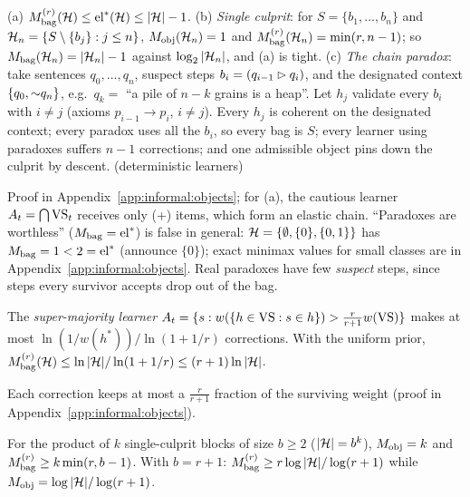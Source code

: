 \begin{theorem}\label{thm:informal:paradoxes}
(a) $M^{(r)}_{\mathrm{bag}}(\mathcal{H})\le\mathrm{el}^*(\mathcal{H})\le|\mathcal{H}|-1$. (b) \emph{Single culprit}: for $S=\{b_1,\dots,b_n\}$ and $\mathcal{H}_n=\{S\setminus\{b_j\}:j\le n\}$, $M_{\mathrm{obj}}(\mathcal{H}_n)=1$ and $M^{(r)}_{\mathrm{bag}}(\mathcal{H}_n)=\min(r,n-1)$; so $M_{\mathrm{bag}}(\mathcal{H}_n)=|\mathcal{H}_n|-1$ against $\log_2|\mathcal{H}_n|$, and (a) is tight. (c) \emph{The chain paradox}: take sentences $q_0,\dots,q_n$, suspect steps $b_i=(q_{i-1}\rhd q_i)$, and the designated context $\{q_0,{\sim} q_n\}$, e.g.\ $q_k=$ ``a pile of $n-k$ grains is a heap''. Let $h_j$ validate every $b_i$ with $i\ne j$ (axioms $p_{i-1}\to p_i$, $i\ne j$). Every $h_j$ is coherent on the designated context; every paradox uses all the $b_i$, so every bag is $S$; every learner using paradoxes suffers $n-1$ corrections; and one admissible object pins down the culprit by descent. \hfill{} (deterministic learners)
\end{theorem}

Proof in Appendix~\ref{app:informal:objects}; for (a), the cautious learner $A_t=\bigcap\mathrm{VS}_t$ receives only (+) items, which form an elastic chain. ``Paradoxes are worthless'' ($M_{\mathrm{bag}}=\mathrm{el}^*$) is false in general: $\mathcal{H}=\{\emptyset,\{0\},\{0,1\}\}$ has $M_{\mathrm{bag}}=1<2=\mathrm{el}^*$ (announce $\{0\}$); exact minimax values for small classes are in Appendix~\ref{app:informal:objects}. Real paradoxes have few \emph{suspect} steps, since steps every survivor accepts drop out of the bag.

\begin{theorem}\label{thm:informal:bags}
The \emph{super-majority learner} $A_t=\{s:w(\{h\in\mathrm{VS}:s\in h\})>\frac{r}{r+1}w(\mathrm{VS})\}$ makes at most $\ln(1/w(h^*))/\ln(1+1/r)$ corrections. With the uniform prior, $M^{(r)}_{\mathrm{bag}}(\mathcal{H})\le\ln|\mathcal{H}|/\ln(1+1/r)\le(r+1)\ln|\mathcal{H}|$. \hfill{}
\end{theorem}

Each correction keeps at most a $\frac r{r+1}$ fraction of the surviving weight (proof in Appendix~\ref{app:informal:objects}).

\begin{proposition}\label{prop:informal:products}
For the product of $k$ single-culprit blocks of size $b\ge2$ ($|\mathcal{H}|=b^k$), $M_{\mathrm{obj}}=k$ and $M^{(r)}_{\mathrm{bag}}\ge k\min(r,b-1)$. With $b=r+1$: $M^{(r)}_{\mathrm{bag}}\ge r\log|\mathcal{H}|/\log(r+1)$ while $M_{\mathrm{obj}}=\log|\mathcal{H}|/\log(r+1)$.
\end{proposition}


